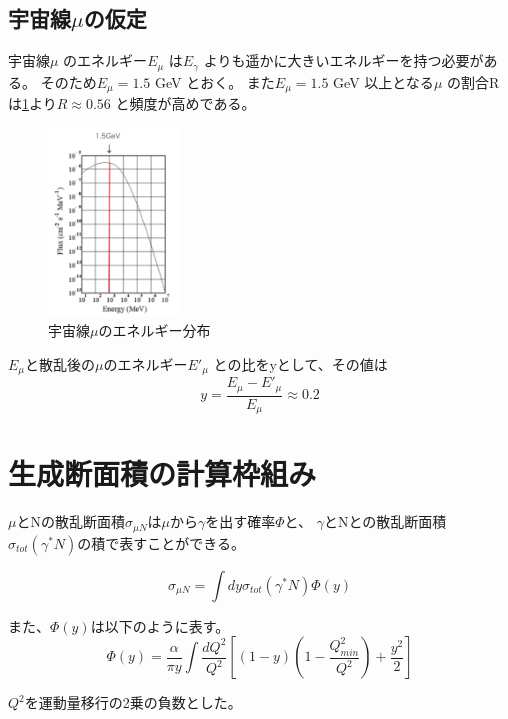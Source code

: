\subsection{宇宙線$\mu$の仮定}
宇宙線$\mu$ のエネルギー$E_\mu$ は$E_\gamma$ よりも遥かに大きいエネルギーを持つ必要がある。
そのため$E_\mu = 1.5$ GeV とおく。
また$E_\mu = 1.5$ GeV 以上となる$\mu$ の割合Rは\ref{fig:sigma2}より$R \approx 0.56$ と頻度が高めである。


\begin{figure}[H]
    \centering
    \includegraphics[height=5cm]{img/cosimic_ray_energy_distribution.png}
    \caption{宇宙線$\mu$のエネルギー分布 \cite{myThesisTest1}}
    \label{fig:sigma2}
\end{figure}

$E_\mu$と散乱後の$\mu$のエネルギー$E'_\mu$ との比をyとして、その値は
\begin{equation}
    y = \dfrac{E_\mu - E'_\mu}{E_\mu} \approx 0.2
\end{equation}

\section{生成断面積の計算枠組み}
$\mu$とNの散乱断面積$\sigma_{\mu N}$は$\mu$から$\gamma$を出す確率$\Phi$と、
$\gamma$とNとの散乱断面積$\sigma_{tot}(\gamma^* N)$の積で表すことができる。

\begin{equation}
    \sigma_{\mu N} =\int dy  \sigma_{tot}(\gamma^* N) \Phi(y)
\end{equation}

また、$\Phi(y)$は以下のように表す。
\begin{equation}
    \Phi(y) = \dfrac{\alpha}{\pi y} \int \dfrac{dQ^2}{Q^2} [(1-y)(1 - \dfrac{Q^2_{min}}{Q^2}) + \dfrac{y^2}{2}]
\end{equation}

$Q^2$を運動量移行の2乗の負数とした。


